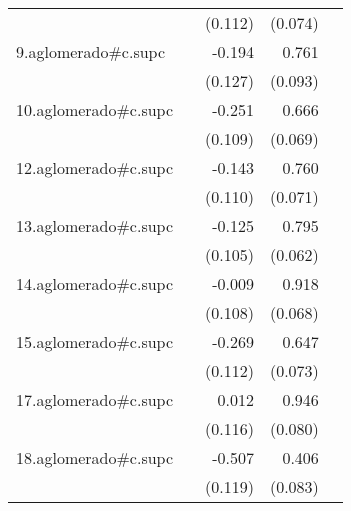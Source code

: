{\begin{longtable}{l*{4}{D{.}{.}{-1}}}
            &                     &     (0.112)         &     (0.074)         &                     \\
\addlinespace
9.aglomerado#c.supc&                     &      -0.194         &       0.761\sym{***}&                     \\
            &                     &     (0.127)         &     (0.093)         &                     \\
\addlinespace
10.aglomerado#c.supc&                     &      -0.251\sym{*}  &       0.666\sym{***}&                     \\
            &                     &     (0.109)         &     (0.069)         &                     \\
\addlinespace
12.aglomerado#c.supc&                     &      -0.143         &       0.760\sym{***}&                     \\
            &                     &     (0.110)         &     (0.071)         &                     \\
\addlinespace
13.aglomerado#c.supc&                     &      -0.125         &       0.795\sym{***}&                     \\
            &                     &     (0.105)         &     (0.062)         &                     \\
\addlinespace
14.aglomerado#c.supc&                     &      -0.009         &       0.918\sym{***}&                     \\
            &                     &     (0.108)         &     (0.068)         &                     \\
\addlinespace
15.aglomerado#c.supc&                     &      -0.269\sym{*}  &       0.647\sym{***}&                     \\
            &                     &     (0.112)         &     (0.073)         &                     \\
\addlinespace
17.aglomerado#c.supc&                     &       0.012         &       0.946\sym{***}&                     \\
            &                     &     (0.116)         &     (0.080)         &                     \\
\addlinespace
18.aglomerado#c.supc&                     &      -0.507\sym{***}&       0.406\sym{***}&                     \\
            &                     &     (0.119)         &     (0.083)         &                     \\

\end{longtable}}
